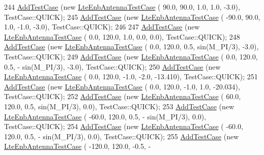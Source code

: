 \begin{DoxyCode}
244   \hyperlink{classns3_1_1TestCase_a3718088e3eefd5d6454569d2e0ddd835}{AddTestCase} (\textcolor{keyword}{new} \hyperlink{classLteEnbAntennaTestCase}{LteEnbAntennaTestCase} (      90.0,     90.0,    1.0,    
            1.0,      -3.0), TestCase::QUICK);
245   \hyperlink{classns3_1_1TestCase_a3718088e3eefd5d6454569d2e0ddd835}{AddTestCase} (\textcolor{keyword}{new} \hyperlink{classLteEnbAntennaTestCase}{LteEnbAntennaTestCase} (     -90.0,     90.0,    1.0,    
           -1.0,      -3.0), TestCase::QUICK); 
246 
247   \hyperlink{classns3_1_1TestCase_a3718088e3eefd5d6454569d2e0ddd835}{AddTestCase} (\textcolor{keyword}{new} \hyperlink{classLteEnbAntennaTestCase}{LteEnbAntennaTestCase} (       0.0,    120.0,    1.0,    
            0.0,       0.0), TestCase::QUICK);
248   \hyperlink{classns3_1_1TestCase_a3718088e3eefd5d6454569d2e0ddd835}{AddTestCase} (\textcolor{keyword}{new} \hyperlink{classLteEnbAntennaTestCase}{LteEnbAntennaTestCase} (       0.0,    120.0,    0.5,  
      sin(M\_PI/3),      -3.0), TestCase::QUICK);
249   \hyperlink{classns3_1_1TestCase_a3718088e3eefd5d6454569d2e0ddd835}{AddTestCase} (\textcolor{keyword}{new} \hyperlink{classLteEnbAntennaTestCase}{LteEnbAntennaTestCase} (       0.0,    120.0,    0.5, -
      sin(M\_PI/3),      -3.0), TestCase::QUICK);
250   \hyperlink{classns3_1_1TestCase_a3718088e3eefd5d6454569d2e0ddd835}{AddTestCase} (\textcolor{keyword}{new} \hyperlink{classLteEnbAntennaTestCase}{LteEnbAntennaTestCase} (       0.0,    120.0,   -1.0,    
           -2.0,   -13.410), TestCase::QUICK);
251   \hyperlink{classns3_1_1TestCase_a3718088e3eefd5d6454569d2e0ddd835}{AddTestCase} (\textcolor{keyword}{new} \hyperlink{classLteEnbAntennaTestCase}{LteEnbAntennaTestCase} (       0.0,    120.0,   -1.0,    
            1.0,   -20.034), TestCase::QUICK);
252   \hyperlink{classns3_1_1TestCase_a3718088e3eefd5d6454569d2e0ddd835}{AddTestCase} (\textcolor{keyword}{new} \hyperlink{classLteEnbAntennaTestCase}{LteEnbAntennaTestCase} (      60.0,    120.0,    0.5,  
      sin(M\_PI/3),       0.0), TestCase::QUICK);
253   \hyperlink{classns3_1_1TestCase_a3718088e3eefd5d6454569d2e0ddd835}{AddTestCase} (\textcolor{keyword}{new} \hyperlink{classLteEnbAntennaTestCase}{LteEnbAntennaTestCase} (     -60.0,    120.0,    0.5, -
      sin(M\_PI/3),       0.0), TestCase::QUICK);
254   \hyperlink{classns3_1_1TestCase_a3718088e3eefd5d6454569d2e0ddd835}{AddTestCase} (\textcolor{keyword}{new} \hyperlink{classLteEnbAntennaTestCase}{LteEnbAntennaTestCase} (     -60.0,    120.0,    0.5, -
      sin(M\_PI/3),       0.0), TestCase::QUICK);
255   \hyperlink{classns3_1_1TestCase_a3718088e3eefd5d6454569d2e0ddd835}{AddTestCase} (\textcolor{keyword}{new} \hyperlink{classLteEnbAntennaTestCase}{LteEnbAntennaTestCase} (    -120.0,    120.0,   -0.5, -

\end{DoxyCode}
